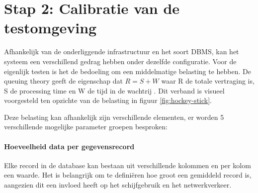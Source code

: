 \section{Stap 2: Calibratie van de testomgeving}
Afhankelijk van de onderliggende infrastructuur en het soort \gls{DBMS}, kan het systeem een verschillend gedrag hebben onder dezelfde configuratie. Voor de eigenlijk testen is het de bedoeling om een middelmatige belasting te hebben. De queuing theory geeft de eigenschap dat $R = S + W$ waar R de totale vertraging is, S de processing time en W de tijd in de wachtrij \cite{millsap2003optimizing}. Dit verband is visueel voorgesteld ten opzichte van de belasting in figuur \ref{fig:hockey-stick}. 

\begin{figure}[h!] 
\centering
	\hfill
	\caption{}
\end{figure}
Deze belasting kan afhankelijk zijn verschillende elementen, er worden 5 verschillende mogelijke parameter groepen besproken:

\paragraph{Hoeveelheid data per gegevensrecord} Elke record in de database kan bestaan uit verschillende kolommen en per kolom een waarde. Het is belangrijk om te definiëren hoe groot een gemiddeld record is, aangezien dit een invloed heeft op het schijfgebruik en het netwerkverkeer.   

